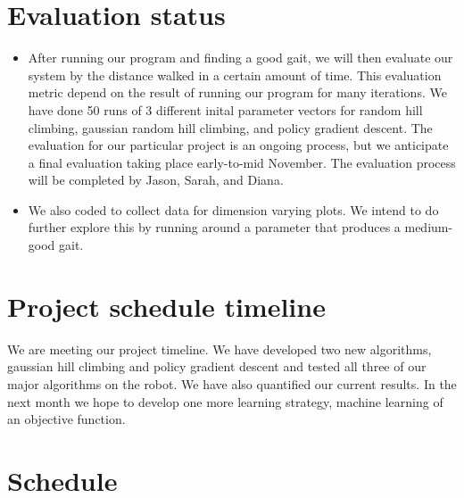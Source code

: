 \section{Evaluation status}

\begin{itemize}
\item After running our program and finding a good gait, we will then
evaluate our system by the distance walked in a certain amount
of time. This evaluation metric depend on the result of
running our program for many iterations. We have done 50 runs of 
3 different inital parameter vectors for random hill climbing, 
gaussian random hill climbing, and policy gradient descent.
The evaluation for our particular project is an ongoing
process, but we anticipate a final evaluation taking place
early-to-mid November. The evaluation process will be completed by
Jason, Sarah, and Diana.

\item We also coded  to collect data for dimension
varying plots. We intend to do further explore this by running
 around a parameter that produces a medium-good gait.
\end{itemize}



\section{Project schedule timeline}

We are meeting our project timeline. We have developed two new algorithms,
gaussian hill climbing and policy gradient descent and tested all three of
our major algorithms on the robot. We have also quantified our current results. 
In the next month we hope to develop one more learning strategy, machine
learning of an objective function.

\section{Schedule}

